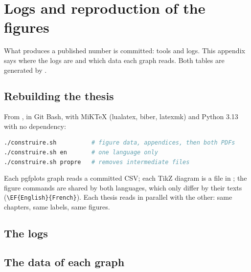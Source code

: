 \chapter{Logs and reproduction of the figures}\label{ann:journaux}

What produces a published number is committed: tools and logs. This appendix says where the logs are and which data each graph reads. Both tables are generated by .

\section{Rebuilding the thesis}

From , in Git Bash, with MiKTeX (lualatex, biber, latexmk) and Python 3.13 with no dependency:
\begin{lstlisting}[language=bash, numbers=none]
./construire.sh          # figure data, appendices, then both PDFs
./construire.sh en       # one language only
./construire.sh propre   # removes intermediate files
\end{lstlisting}
Each pgfplots graph reads a committed CSV; each TikZ diagram is a file in ; the figure commands are shared by both languages, which only differ by their texts (\verb|\EF{English}{French}|). Each thesis reads in parallel with the other: same chapters, same labels, same figures.

\section{The logs}



\section{The data of each graph}



